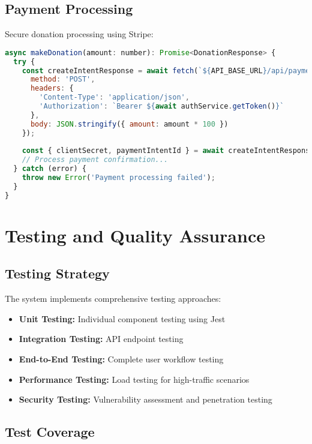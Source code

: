 \documentclass[12pt,a4paper]{article}
\begin{document}
\subsection{Payment Processing}

Secure donation processing using Stripe:

\begin{lstlisting}[language=JavaScript, caption=Payment Processing]
async makeDonation(amount: number): Promise<DonationResponse> {
  try {
    const createIntentResponse = await fetch(`${API_BASE_URL}/api/payments/create-payment-intent`, {
      method: 'POST',
      headers: {
        'Content-Type': 'application/json',
        'Authorization': `Bearer ${await authService.getToken()}`
      },
      body: JSON.stringify({ amount: amount * 100 })
    });
    
    const { clientSecret, paymentIntentId } = await createIntentResponse.json();
    // Process payment confirmation...
  } catch (error) {
    throw new Error('Payment processing failed');
  }
}
\end{lstlisting}

\section{Testing and Quality Assurance}

\subsection{Testing Strategy}

The system implements comprehensive testing approaches:

\begin{itemize}
    \item \textbf{Unit Testing:} Individual component testing using Jest
    \item \textbf{Integration Testing:} API endpoint testing
    \item \textbf{End-to-End Testing:} Complete user workflow testing
    \item \textbf{Performance Testing:} Load testing for high-traffic scenarios
    \item \textbf{Security Testing:} Vulnerability assessment and penetration testing
\end{itemize}

\subsection{Test Coverage}
\end{document}
